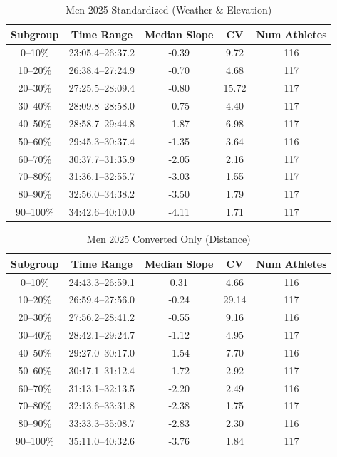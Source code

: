 \documentclass[suppldata]{interact}
\theoremstyle{plain}%
\theoremstyle{definition}
\theoremstyle{remark}
\begin{document}
\begin{table}[htbp]
\renewcommand{\arraystretch}{1.1}
\begin{tabular}{c c c c c}
\toprule
Subgroup& Time Range & Median Slope & CV& Num Athletes \\
\midrule
0--10\%   & 23:05.4--26:37.2 & -0.39 & 9.72  & 116 \\
    10--20\%  & 26:38.4--27:24.9 & -0.70 & 4.68  & 117 \\
    20--30\%  & 27:25.5--28:09.4 & -0.80 & 15.72 & 117 \\
    30--40\%  & 28:09.8--28:58.0 & -0.75 & 4.40  & 117 \\
    40--50\%  & 28:58.7--29:44.8 & -1.87 & 6.98  & 117 \\
    50--60\%  & 29:45.3--30:37.4 & -1.35 & 3.64  & 116 \\
    60--70\%  & 30:37.7--31:35.9 & -2.05 & 2.16  & 117 \\
    70--80\%  & 31:36.1--32:55.7 & -3.03 & 1.55  & 117 \\
    80--90\%  & 32:56.0--34:38.2 & -3.50 & 1.79  & 117 \\
    90--100\% & 34:42.6--40:10.0 & -4.11 & 1.71  & 117 \\
\bottomrule
\end{tabular}
\centering
\caption{Men 2025 Standardized (Weather \& Elevation)}
\label{tab:2025_stand}
\end{table}

\begin{table}[htbp]
\renewcommand{\arraystretch}{1.1}
\begin{tabular}{c c c c c}
\toprule
Subgroup& Time Range & Median Slope & CV& Num Athletes \\
\midrule
0--10\%   & 24:43.3--26:59.1 &  0.31 & 4.66  & 116 \\
    10--20\%  & 26:59.4--27:56.0 & -0.24 & 29.14 & 117 \\
    20--30\%  & 27:56.2--28:41.2 & -0.55 & 9.16  & 116 \\
    30--40\%  & 28:42.1--29:24.7 & -1.12 & 4.95  & 117 \\
    40--50\%  & 29:27.0--30:17.0 & -1.54 & 7.70  & 116 \\
    50--60\%  & 30:17.1--31:12.4 & -1.72 & 2.92  & 117 \\
    60--70\%  & 31:13.1--32:13.5 & -2.20 & 2.49  & 116 \\
    70--80\%  & 32:13.6--33:31.8 & -2.38 & 1.75  & 117 \\
    80--90\%  & 33:33.3--35:08.7 & -2.83 & 2.30  & 116 \\
    90--100\% & 35:11.0--40:32.6 & -3.76 & 1.84  & 117 \\
\bottomrule
\end{tabular}
\centering
\caption{Men 2025 Converted Only (Distance)}
\label{tab:2025_converted}
\end{table}
\end{document}
